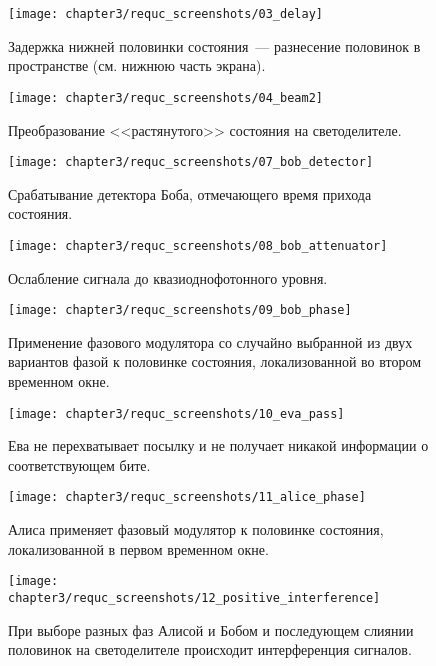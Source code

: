 \begin{figure}[h]
  \texttt{[image: chapter3/requc\_screenshots/03\_delay]}
  \caption{Задержка нижней половинки состояния~--- разнесение половинок в пространстве (см. нижнюю часть экрана).}
\end{figure}

\begin{figure}[h]
  \texttt{[image: chapter3/requc\_screenshots/04\_beam2]}
  \caption{Преобразование <<растянутого>> состояния на светоделителе.}
\end{figure}

\begin{figure}[h]
  \texttt{[image: chapter3/requc\_screenshots/07\_bob\_detector]}
  \caption{Срабатывание детектора Боба, отмечающего время прихода состояния.}
\end{figure}

\FloatBarrier

\begin{figure}[h]
  \texttt{[image: chapter3/requc\_screenshots/08\_bob\_attenuator]}
  \caption{Ослабление сигнала до квазиоднофотонного уровня.}
\end{figure}

\begin{figure}[h]
  \texttt{[image: chapter3/requc\_screenshots/09\_bob\_phase]}
  \caption{Применение фазового модулятора со случайно выбранной из двух вариантов фазой к половинке состояния, локализованной во втором временном окне.}
\end{figure}

\begin{figure}[h]
  \texttt{[image: chapter3/requc\_screenshots/10\_eva\_pass]}
  \caption{Ева не перехватывает посылку и не получает никакой информации о соответствующем бите.}
\end{figure}

\begin{figure}[h]
  \texttt{[image: chapter3/requc\_screenshots/11\_alice\_phase]}
  \caption{Алиса применяет фазовый модулятор к половинке состояния, локализованной в первом временном окне.}
\end{figure}

\begin{figure}[h]
  \texttt{[image: chapter3/requc\_screenshots/12\_positive\_interference]}
  \caption{При выборе разных фаз Алисой и Бобом и последующем слиянии половинок на светоделителе происходит интерференция сигналов.}
\end{figure}

